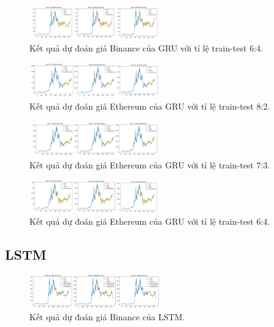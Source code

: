 \documentclass{ieeeojies}
\begin{document}
\begin{figure}[h]
    \centering
    \includegraphics[width=0.5\textwidth]{bibliography/pictures/BNB_GRU_64.jpg}
    \caption{Kết quả dự đoán giá Binance của GRU với tỉ lệ train-test 6:4.}
\end{figure}
\begin{figure}[h]
    \centering
    \includegraphics[width=0.5\textwidth]{bibliography/pictures/ETH_GRU_82.jpg}
    \caption{Kết quả dự đoán giá Ethereum của GRU với tỉ lệ train-test 8:2.}
\end{figure}
\begin{figure}[h]
    \centering
    \includegraphics[width=0.5\textwidth]{bibliography/pictures/ETH_GRU_73.jpg}
    \caption{Kết quả dự đoán giá Ethereum của GRU với tỉ lệ train-test 7:3.}
\end{figure}
\begin{figure}[h]
    \centering
    \includegraphics[width=0.5\textwidth]{bibliography/pictures/ETH_GRU_64.jpg}
    \caption{Kết quả dự đoán giá Ethereum của GRU với tỉ lệ train-test 6:4.}
\end{figure}


\subsection{LSTM}
\begin{figure}[h]
    \centering
    \includegraphics[width=0.5\textwidth]{bibliography/pictures/LSTM BNB.jpg}
    \caption{Kết quả dự đoán giá Binance của LSTM.}
\end{figure}
\end{document}
